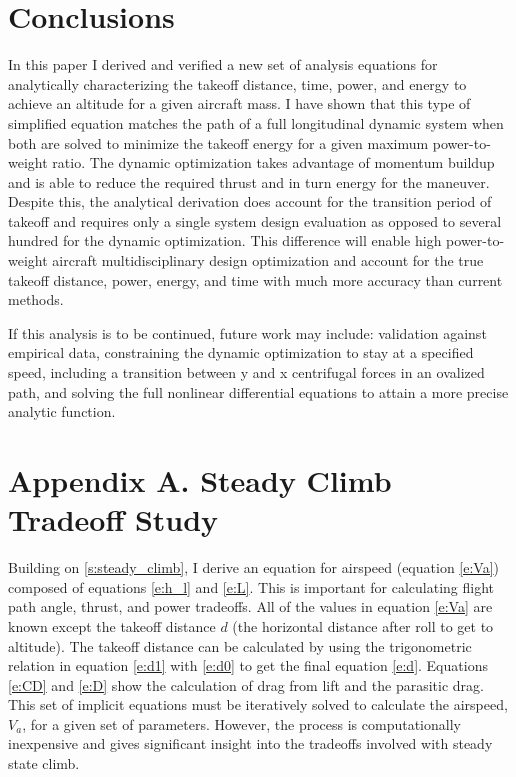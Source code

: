 \documentclass[10pt,english]{article}
\begin{document}
\section{Conclusions}
In this paper I derived and verified a new set of analysis equations for analytically characterizing the takeoff distance, time, power, and energy to achieve an altitude for a given aircraft mass.  I have shown that this type of simplified equation matches the path of a full longitudinal dynamic system when both are solved to minimize the takeoff energy for a given maximum power-to-weight ratio.  The dynamic optimization takes advantage of momentum buildup and is able to reduce the required thrust and in turn energy for the maneuver.  Despite this, the analytical derivation does account for the transition period of takeoff and requires only a single system design evaluation as opposed to several hundred for the dynamic optimization.  This difference will enable high power-to-weight aircraft multidisciplinary design optimization and account for the true takeoff distance, power, energy, and time with much more accuracy than current methods.  

If this analysis is to be continued, future work may include: validation against empirical data, constraining the dynamic optimization to stay at a specified speed, including a transition between y and x centrifugal forces in an ovalized path, and solving the full nonlinear differential equations to attain a more precise analytic function.




\section{Appendix A. Steady Climb Tradeoff Study}

Building on \cref{s:steady_climb}, I derive an equation for airspeed (equation \ref{e:Va}) composed of equations \ref{e:h_l} and \ref{e:L}.  This is important for calculating flight path angle, thrust, and power tradeoffs.  All of the values in equation \ref{e:Va} are known except the takeoff distance $d$ (the horizontal distance after roll to get to altitude).  The takeoff distance can be calculated by using the trigonometric relation in equation \ref{e:d1} with \ref{e:d0} to get the final equation \ref{e:d}.   Equations \ref{e:CD} and \ref{e:D} show the calculation of drag from lift and the parasitic drag.  This set of implicit equations must be iteratively solved to calculate the airspeed, $V_a$, for a given set of parameters.  However, the process is computationally inexpensive and gives significant insight into the tradeoffs involved with steady state climb.
\end{document}
